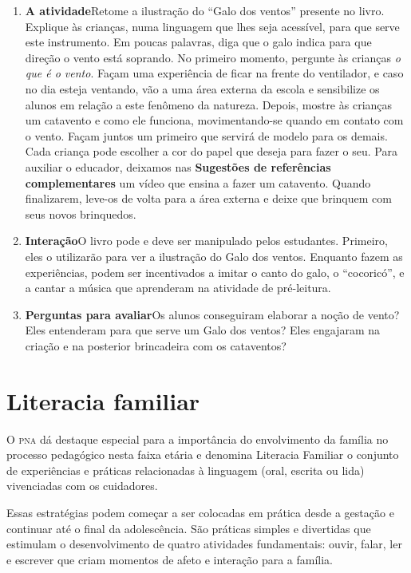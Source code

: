 \documentclass[11pt]{extarticle}
\begin{document}
\begin{enumerate}
\item \textbf{A atividade}\quad Retome a ilustração do ``Galo dos ventos''
presente no livro. 
Explique às crianças, numa linguagem que lhes seja acessível, para que serve
este instrumento. Em poucas palavras, diga que o galo indica para que direção
o vento está soprando. 
No primeiro momento, pergunte às crianças \emph{o que é o vento}. 
Façam uma experiência de ficar na frente do ventilador, e caso no dia esteja
ventando, vão a uma área externa da escola e sensibilize os alunos em relação
a este fenômeno da natureza. 
Depois, mostre às crianças um catavento e como ele funciona, movimentando-se
quando em contato com o vento. 
Façam juntos um primeiro que servirá de modelo para os demais. 
Cada criança pode escolher a cor do papel que deseja para fazer o seu.
Para auxiliar o educador, deixamos nas \textbf{Sugestões de referências complementares}
um vídeo que ensina a fazer um catavento.
Quando finalizarem, leve-os de volta para a área externa e deixe que brinquem
com seus novos brinquedos.



\item \textbf{Interação}\quad O livro pode e deve ser 
manipulado pelos estudantes. Primeiro, eles o utilizarão para
ver a ilustração do Galo dos ventos. Enquanto fazem as experiências, 
podem ser incentivados a imitar o canto do galo, o ``cocoricó'',
e a cantar a música que aprenderam na atividade de pré-leitura. 

\item \textbf{Perguntas para avaliar}\quad Os alunos conseguiram
elaborar a noção de vento? Eles entenderam para que serve um Galo dos ventos? 
Eles engajaram na criação e na posterior brincadeira com os cataventos? 
\end{enumerate}


\section{Literacia familiar}
O \textsc{pna} dá destaque especial para a importância do envolvimento da família 
no processo pedagógico nesta faixa etária e denomina Literacia Familiar o conjunto 
de experiências e práticas relacionadas à linguagem (oral, escrita ou lida) vivenciadas 
com os cuidadores. 

Essas estratégias podem começar a ser colocadas em prática desde a 
gestação e continuar até o final da adolescência. São práticas simples e divertidas 
que estimulam o desenvolvimento de quatro atividades fundamentais: ouvir, falar, 
ler e escrever que criam momentos de afeto e interação para a família. 
\end{document}
